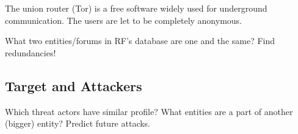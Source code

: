 The union router (Tor) is a free software widely used for underground communication. The users are let to be completely anonymous. 

What two entities/forums in RF’s database are one and the same? Find redundancies!

\subsection{Target and Attackers}
Which threat actors have similar profile? 
What entities are a part of another (bigger) entity?
Predict future attacks.


\newpage 

